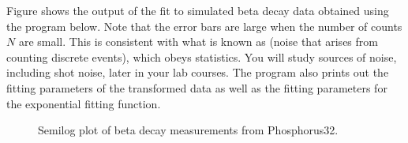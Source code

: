 \documentclass[letterpaper,10pt,english]{sphinxmanual}
\begin{document}
\sphinxAtStartPar
Figure {\hyperref[\detokenize{chap8/chap8_fitting:fig-betadecay}]{}} shows the output of the fit to simulated beta decay data obtained using the program below.  Note that the error bars are large when the number of counts \(N\) are small.  This is consistent with what is known as  (noise that arises from counting discrete events), which obeys  statistics.  You will study sources of noise, including shot noise, later in your lab courses.  The program also prints out the fitting parameters of the transformed data as well as the fitting parameters for the exponential fitting function.

\begin{figure}[htbp]
\centering
\capstart

\noindent{}
\caption{Semi\sphinxhyphen{}log plot of beta decay measurements from Phosphorus\sphinxhyphen{}32.}\label{\detokenize{chap8/chap8_fitting:id1}}\label{\detokenize{chap8/chap8_fitting:fig-betadecay}}\end{figure}
\end{document}
